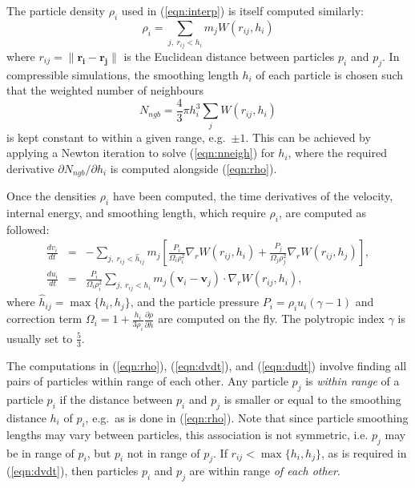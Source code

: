 \documentclass{sig-alternate-05-2015}
\newcommand{\eqn}[1] {(\ref{eqn:#1})}
\begin{document}
The particle density $\rho_i$ used in \eqn{interp} is itself computed similarly:
%
\begin{equation}
    \rho_i = \sum_{j,~r_{ij} < h_i} m_j W(r_{ij},h_i)
    \label{eqn:rho}
\end{equation}
%
where $r_{ij} = \|\mathbf{r_i}-\mathbf{r_j}\|$ is the Euclidean distance between
particles $p_i$ and $p_j$.  In compressible simulations, the smoothing length
$h_i$ of each particle is chosen such that the weighted number of neighbours
%
\begin{equation}
    N_{ngb} = \frac{4}{3}\pi h_i^3 \sum_j W( r_{ij} , h_i )
    \label{eqn:nneigh}
\end{equation}
%
is kept constant to within a given range, e.g.~$\pm 1$.  This can be achieved by
applying a Newton iteration to solve \eqn{nneigh} for $h_i$, where the required
derivative $\partial N_{ngb}/\partial h_i$ is computed alongside \eqn{rho}.

Once the densities $\rho_i$ have been computed, the time derivatives of the
velocity, internal energy, and smoothing length, which require $\rho_i$, are
computed as followed:
%
\begin{eqnarray}
    \frac{dv_i}{dt} & = & -\sum_{j,~r_{ij} < \hat{h}_{ij}} m_j \left[
        \frac{P_i}{\Omega_i\rho_i^2}\nabla_rW(r_{ij},h_i) +
        \frac{P_j}{\Omega_j\rho_j^2}\nabla_rW(r_{ij},h_j) \right], \label{eqn:dvdt} \\ 
    \frac{du_i}{dt} & = & \frac{P_i}{\Omega_i\rho_i^2} \sum_{j,~r_{ij} < h_i} m_j(\mathbf v_i - \mathbf v_j) \cdot \nabla_rW(r_{ij},h_i), \label{eqn:dudt}
\end{eqnarray}
%
where $\hat{h}_{ij} = \max\{h_i,h_j\}$, and the particle pressure $P_i=\rho_i
u_i (\gamma-1)$ and correction term $\Omega_i=1 +
\frac{h_i}{3\rho_i}\frac{\partial \rho}{\partial h}$ are computed on the fly.
The polytropic index $\gamma$ is usually set to $\frac{5}{3}$.

The computations in \eqn{rho}, \eqn{dvdt}, and \eqn{dudt} involve finding all
pairs of particles within range of each other.  Any particle $p_j$ is {\em
  within range} of a particle $p_i$ if the distance between $p_i$ and $p_j$ is
smaller or equal to the smoothing distance $h_i$ of $p_i$, e.g.~as is done in
\eqn{rho}.  Note that since particle smoothing lengths may vary between
particles, this association is not symmetric, i.e. $p_j$ may be in range of
$p_i$, but $p_i$ not in range of $p_j$.  If $r_{ij} < \max\{h_i,h_j\}$, as is
required in \eqn{dvdt}, then particles $p_i$ and $p_j$ are within range {\em of
  each other}.
\end{document}
